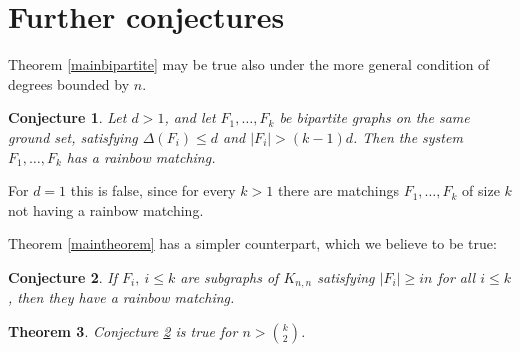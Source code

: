 \documentclass{amsart}
\newtheorem{theorem}{Theorem}[section]
\newtheorem{conjecture}[theorem]{Conjecture}
\theoremstyle{remark}
\begin{document}
\section{Further conjectures}
Theorem \ref{mainbipartite} may be true also under the more general condition of degrees bounded by $n$.
\begin{conjecture}\label{degreecondition}
Let $d>1$, and let $F_1, \ldots, F_k$ be bipartite graphs on the same ground set,
satisfying $\Delta(F_i) \le d$ and $|F_i|>(k-1)d$. Then the system $F_1, \ldots, F_k$ has a rainbow matching.
\end{conjecture}

For $d=1$ this is false, since for every $k>1$ there are matchings
$F_1, \ldots, F_k$ of size $k$ not having a rainbow matching.

Theorem \ref{maintheorem} has a simpler counterpart, which we believe to be true:

\begin{conjecture}\label{simple}
If $F_i,~i \le k$ are subgraphs of $K_{n,n}$ satisfying $|F_i|\ge
in$ for all $i \le k$, then they have  a rainbow matching.
\end{conjecture}

\begin{theorem}
Conjecture  \ref{simple} is true for $n > \binom{k}{2}$.
\end{theorem}
\end{document}
